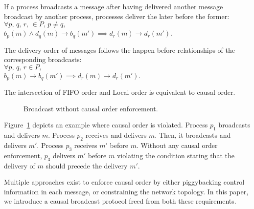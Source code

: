 \begin{definition}
  If a process broadcasts a message after having delivered another message
  broadcast by another process, processes deliver the later before the former:\\
  $\forall p,\,q,\,r,\, \in P,\,p\neq q,\,$\\$b_p(m) \wedge d_q(m) \rightarrow b_q(m') \implies d_r(m) \rightarrow d_r(m')$.
\end{definition}

\begin{definition}
  The delivery order of messages follows the happen before relationships of the
  corresponding broadcasts:\\ $\forall
  p,\,q,\,r \in P,\,$\\$b_p(m) \rightarrow b_q(m') \implies d_r(m) \rightarrow d_r(m')$.
\end{definition}

\begin{theorem}
  The intersection of FIFO order and Local order is equivalent to causal order.
\end{theorem}

\begin{figure}
  \begin{center}
  
  \caption{\label{fig:generalproblem}Broadcast without causal order
    enforcement.}
  \end{center}
\end{figure}

Figure~\ref{fig:generalproblem} depicts an example where causal order is
violated. Process $p_1$ broadcasts and delivers $m$. Process $p_2$ receives and
delivers $m$. Then, it broadcasts and delivers $m'$. Process $p_3$ receives $m'$
before $m$. Without any causal order enforcement, $p_3$ delivers $m'$ before $m$
violating the condition stating that the delivery of $m$ should precede the
delivery $m'$.

Multiple approaches exist to enforce causal order by either piggybacking control
information in each message, or constraining the network topology. In this
paper, we introduce a causal broadcast protocol freed from both these
requirements.


